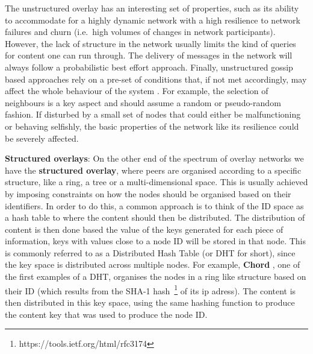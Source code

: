 The unstructured overlay has an interesting set of properties, such as
its ability to accommodate for a highly dynamic network with a high
resilience to network failures and churn (i.e.~high volumes of changes
in network participants). However, the lack of structure in the network
usually limits the kind of queries for content one can run through. The
delivery of messages in the network will always follow a probabilistic
best effort approach. Finally, unstructured gossip based approaches rely
on a pre-set of conditions that, if not met accordingly, may affect the
whole behaviour of the system \cite{Alvisi2007}. For example, the selection of
neighbours is a key aspect and should assume a random or pseudo-random
fashion. If disturbed by a small set of nodes that could either be
malfunctioning or behaving selfishly, the basic properties of the
network like its resilience could be severely affected.
\bigskip

\textbf{Structured overlays}: On the other end of the spectrum of
overlay networks we have the \textbf{structured overlay}, where peers
are organised according to a specific structure, like a ring, a tree or
a multi-dimensional space. This is usually achieved by imposing
constraints on how the nodes should be organised based on their
identifiers. In order to do this, a common approach is to think of the
ID space as a hash table to where the content should then be
distributed. The distribution of content is then done based the value of
the keys generated for each piece of information, keys with values close
to a node ID will be stored in that node. This is commonly referred to
as a Distributed Hash Table (or DHT for short), since the key space is
distributed across multiple nodes. For example, \textbf{Chord} \cite{Stoica2001},
one of the first examples of a DHT, organises the nodes in a ring like structure
based on their ID (which results from the SHA-1 hash~\footnote{https://tools.ietf.org/html/rfc3174}
of its ip adress). The content is then distributed in this key space, using the same hashing function to
produce the content key that was used to produce the node ID.

